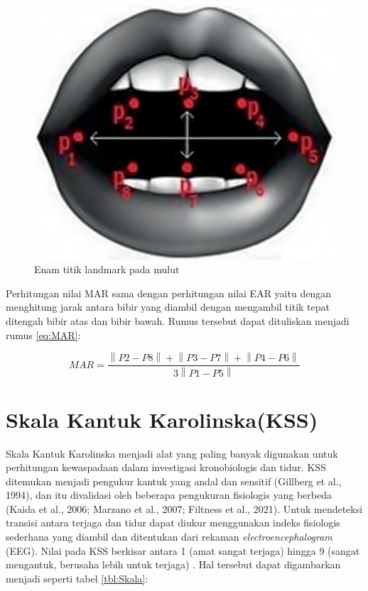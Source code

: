 \begin{figure} [H] \centering
  \includegraphics[scale=0.4]{gambar/mulut.png}
  \caption{Enam titik landmark pada mulut \parencite{21}}
  \label{fig:mulut}
\end{figure}

Perhitungan nilai MAR sama dengan perhitungan nilai EAR yaitu dengan menghitung jarak antara bibir yang diambil dengan
mengambil titik tepat ditengah bibir atas dan bibir bawah. Rumus tersebut dapat dituliskan menjadi rumus \ref{eq:MAR}:

\begin{equation}
  \label{eq:MAR}
  MAR = \frac{\left \| P2-P8 \right \| + \left \| P3-P7 \right \| + \left \| P4-P6 \right \|}{3 \left \| P1-P5 \right \|}
\end{equation}

\section{Skala Kantuk Karolinska(KSS)}
Skala Kantuk Karolinska menjadi alat yang paling banyak digunakan untuk perhitungan kewaspadaan dalam investigasi
kronobiologis dan tidur. KSS ditemukan menjadi pengukur kantuk yang andal dan sensitif (Gillberg et al., 1994), dan
itu divalidasi oleh beberapa pengukuran fisiologis yang berbeda (Kaida et al., 2006; Marzano et al., 2007; Filtness
et al., 2021). Untuk mendeteksi transisi antara terjaga dan tidur dapat diukur menggunakan indeks fisiologis
sederhana yang diambil dan ditentukan dari rekaman \emph{electroencephalogram} (EEG). Nilai pada KSS berkisar antara 1
(amat sangat terjaga) hingga 9 (sangat mengantuk, berusaha lebih untuk terjaga) \parencite{19}. Hal tersebut dapat
digambarkan menjadi seperti tabel \ref{tbl:Skala}:

